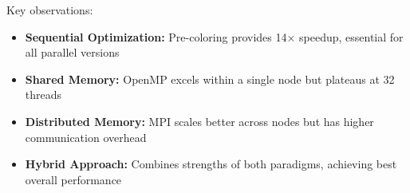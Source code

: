 Key observations:
\begin{itemize}
    \item \textbf{Sequential Optimization:} Pre-coloring provides 14× speedup, essential for all parallel versions
    \item \textbf{Shared Memory:} OpenMP excels within a single node but plateaus at 32 threads
    \item \textbf{Distributed Memory:} MPI scales better across nodes but has higher communication overhead
    \item \textbf{Hybrid Approach:} Combines strengths of both paradigms, achieving best overall performance
\end{itemize}